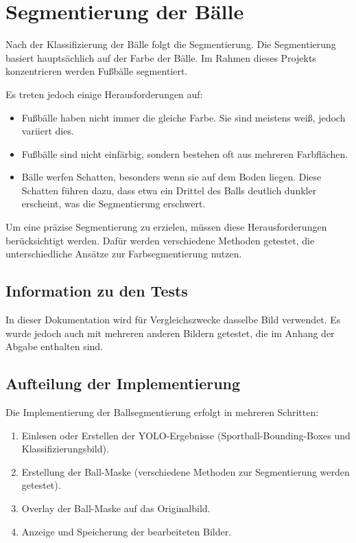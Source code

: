 \section{Segmentierung der Bälle}

Nach der Klassifizierung der Bälle folgt die Segmentierung. Die Segmentierung basiert hauptsächlich auf der Farbe der Bälle. Im Rahmen dieses Projekts konzentrieren werden Fußbälle segmentiert.

Es treten jedoch einige Herausforderungen auf:
\begin{itemize}
    \item Fußbälle haben nicht immer die gleiche Farbe. Sie sind meistens weiß, jedoch variiert dies.
    \item Fußbälle sind nicht einfärbig, sondern bestehen oft aus mehreren Farbflächen.
    \item Bälle werfen Schatten, besonders wenn sie auf dem Boden liegen. Diese Schatten führen dazu, dass etwa ein Drittel des Balls deutlich dunkler erscheint, was die Segmentierung erschwert.
\end{itemize}

Um eine präzise Segmentierung zu erzielen, müssen diese Herausforderungen berücksichtigt werden. Dafür werden verschiedene Methoden getestet, die unterschiedliche Ansätze zur Farbsegmentierung nutzen.


\subsection{Information zu den Tests}

In dieser Dokumentation wird für Vergleichszwecke dasselbe Bild verwendet. Es wurde jedoch auch mit mehreren anderen Bildern getestet, die im Anhang der Abgabe enthalten sind.



\subsection{Aufteilung der Implementierung}

Die Implementierung der Ballsegmentierung erfolgt in mehreren Schritten:
\begin{enumerate}
    \item Einlesen oder Erstellen der YOLO-Ergebnisse (Sportball-Bounding-Boxes und Klassifizierungsbild).
    \item Erstellung der Ball-Maske (verschiedene Methoden zur Segmentierung werden getestet).
    \item Overlay der Ball-Maske auf das Originalbild.
    \item Anzeige und Speicherung der bearbeiteten Bilder.
\end{enumerate}


